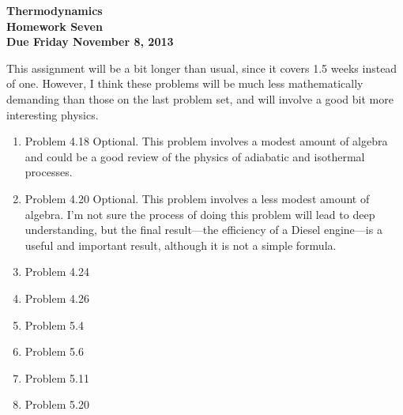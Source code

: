 \documentclass[12pt]{article}
\begin{document}
\pagestyle{empty}
 
\begin{center}
{\large {\bf Thermodynamics}}\\
\medskip
{\large {\bf Homework Seven}}\\
\medskip
{ {\bf Due Friday November 8, 2013}}\\
\end{center}

\noindent This assignment will be a bit longer than usual, since it
covers 1.5 weeks instead of one.  However, I think these problems will
be much less mathematically demanding than those on the last problem
set, and will involve a good bit more interesting physics.

\begin{enumerate}

  \item Problem 4.18  Optional.  This problem involves a modest amount
    of algebra and could be a good review of the physics of adiabatic
    and isothermal processes. 
  \item Problem 4.20  Optional.  This problem involves a less modest
    amount of algebra.  I'm not sure the process of doing this problem
    will lead to deep understanding, but the final result---the
    efficiency of a Diesel engine---is a useful and important result,
    although it is not a simple formula.  
 
  \item Problem 4.24  
  \item Problem 4.26
  \item Problem 5.4
  \item Problem 5.6
  \item Problem 5.11
  \item Problem 5.20

\end{enumerate}
\end{document}
